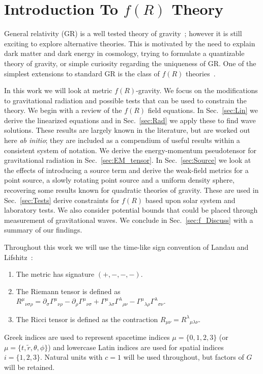 \documentclass[aps,prd,amsfonts,amssymb,amsmath,nofootinbib,reprint,showpacs]{revtex4-1}
\newcommand{\secref}[1]{Sec.\ \ref{sec:#1}}
\begin{document}
\section{Introduction To $f(R)$ Theory}

General relativity (GR) is a well tested theory of gravity~\cite{Will2006}; however it is still exciting to explore alternative theories. This is motivated by the need to explain dark matter and dark energy in cosmology, trying to formulate a quantizable theory of gravity, or simple curiosity regarding the uniqueness of GR. One of the simplest extensions to standard GR is the class of $f(R)$ theories~\cite{Sotiriou2010, DeFelice2010}.

In this work we will look at metric $f(R)$-gravity. We focus on the modifications to gravitational radiation and possible tests that can be used to constrain the theory. We begin with a review of the $f(R)$ field equations. In \secref{Lin} we derive the linearized equations and in \secref{Rad} we apply these to find wave solutions. These results are largely known in the literature, but are worked out here {\it ab initio}; they are included as a compendium of useful results within a consistent system of notation. We derive the energy-momentum pseudotensor for gravitational radiation in \secref{EM_tensor}. In \secref{Source} we look at the effects of introducing a source term and derive the weak-field metrics for a point source, a slowly rotating point source and a uniform density sphere, recovering some results known for quadratic theories of gravity. These are used in \secref{Tests} derive constraints for $f(R)$ based upon solar system and laboratory tests. We also consider potential bounds that could be placed through measurement of gravitational waves. We conclude in \secref{f_Discuss} with a summary of our findings.

Throughout this work we will use the time-like sign convention of Landau and Lifshitz~\cite{Landau1975}:
\begin{enumerate}
\item The metric has signature $(+,-,-,-)$.
\item The Riemann tensor is defined as ${R^\mu}_{\nu\sigma\rho} = \partial_\sigma {\Gamma^\mu}_{\nu\rho} - \partial_\rho {\Gamma^\mu}_{\nu\sigma} + {\Gamma^\mu}_{\lambda\sigma}{\Gamma^\lambda}_{\rho\nu} - {\Gamma^\mu}_{\lambda\rho}{\Gamma^\lambda}_{\sigma\nu}$.
\item The Ricci tensor is defined as the contraction $R_{\mu\nu} = {R^\lambda}_{\mu\lambda\nu}$.
\end{enumerate}
Greek indices are used to represent spacetime indices $\mu = \{0,1,2,3\}$ (or $\mu = \{t,\widetilde{r},\theta,\phi\}$) and lowercase Latin indices are used for spatial indices $i = \{1,2,3\}$. Natural units with $c = 1$ will be used throughout, but factors of $G$ will be retained.
\end{document}
